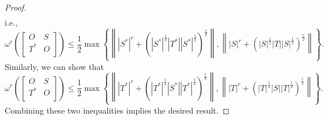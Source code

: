 \documentclass[12pt,twoside,reqno]{amsart}
\numberwithin{equation}{section}
\begin{document}
\begin{proof}
\[\begin{aligned}
\end{aligned}\]
i.e.,
\[{{\omega }^{r}}\left( \left[ \begin{matrix}
   O & S  \\
   {{T}^{*}} & O  \\
\end{matrix} \right] \right)\le \frac{1}{2}\max \left\{ \left\| {{\left| {{S}^{*}} \right|}^{r}}+{{\left( {{\left| {{S}^{*}} \right|}^{\frac{1}{2}}}\left| {{T}^{*}} \right|{{\left| {{S}^{*}} \right|}^{\frac{1}{2}}} \right)}^{\frac{r}{2}}} \right\|,\left\| {{\left| S \right|}^{r}}+{{\left( {{\left| S \right|}^{\frac{1}{2}}}\left| T \right|{{\left| S \right|}^{\frac{1}{2}}} \right)}^{\frac{r}{2}}} \right\| \right\}.\]
Similarly, we can show that
\[{{\omega }^{r}}\left( \left[ \begin{matrix}
   O & S  \\
   {{T}^{*}} & O  \\
\end{matrix} \right] \right)\le \frac{1}{2}\max \left\{ \left\| {{\left| {{T}^{*}} \right|}^{r}}+{{\left( {{\left| {{T}^{*}} \right|}^{\frac{1}{2}}}\left| {{S}^{*}} \right|{{\left| {{T}^{*}} \right|}^{\frac{1}{2}}} \right)}^{\frac{r}{2}}} \right\|,\left\| {{\left| T \right|}^{r}}+{{\left( {{\left| T \right|}^{\frac{1}{2}}}\left| S \right|{{\left| T \right|}^{\frac{1}{2}}} \right)}^{\frac{r}{2}}} \right\| \right\}.\]
Combining these two inequalities implies the desired result.
\end{proof}
\end{document}
